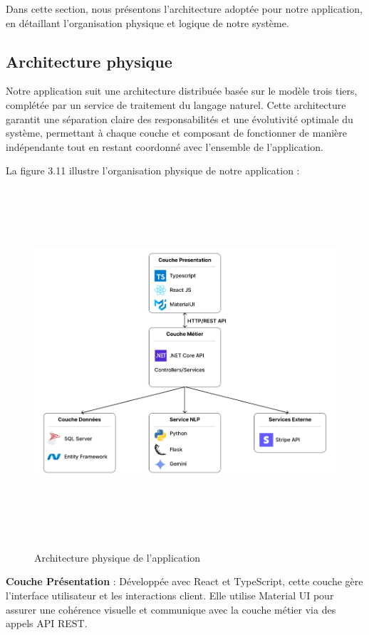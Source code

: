 \noindent Dans cette section, nous présentons l'architecture adoptée pour notre application, en détaillant l'organisation physique et logique de notre système.

\subsection{Architecture physique}

\noindent Notre application suit une architecture distribuée basée sur le modèle trois tiers, complétée par un service de traitement du langage naturel. Cette architecture garantit une séparation claire des responsabilités et une évolutivité optimale du système, permettant à chaque couche et composant de fonctionner de manière indépendante tout en restant coordonné avec l’ensemble de l’application.

\noindent La figure 3.11 illustre l'organisation physique de notre application :

\begin{figure}[H]
    \centering
    \includegraphics[width=16cm, height=13cm]{images/Architecturephysique.PNG}
    \label{fig:arch_physique}
    \caption{Architecture physique de l'application}
\end{figure}



\noindent\textbf{Couche Présentation} : Développée avec React et TypeScript, cette couche gère l'interface utilisateur et les interactions client. Elle utilise Material UI pour assurer une cohérence visuelle et communique avec la couche métier via des appels API REST.

